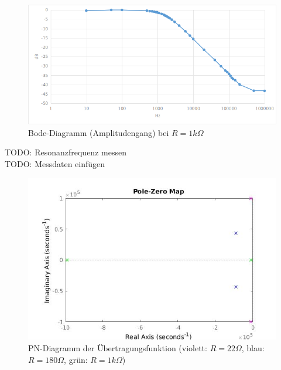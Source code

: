 \documentclass[12pt,a4paper,titlepage]{article}
\begin{document}
\begin{figure}[H]
  \centering
  \includegraphics[width=150mm]{bode_rlc_1k.png}
  \caption{Bode-Diagramm (Amplitudengang) bei $R=1k\Omega$}
\end{figure}
TODO: Resonanzfrequenz messen\\
TODO: Messdaten einfügen\\

\begin{figure}[H]
  \centering
  \includegraphics[width=150mm]{pnd.jpg}
  \caption{PN-Diagramm der \"Ubertragungsfunktion (violett: $R=22\Omega$, blau: $R=180\Omega$, gr\"un: $R=1k\Omega$)}
\end{figure}
\end{document}
